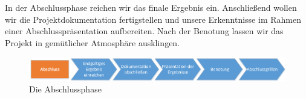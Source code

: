 In der Abschlussphase reichen wir das finale Ergebnis ein. Anschließend wollen wir die Projektdokumentation fertigstellen und unsere Erkenntnisse im Rahmen einer Abschlusspräsentation aufbereiten. Nach der Benotung lassen wir das Projekt in gemütlicher Atmosphäre ausklingen.

\begin{figure}[h]
\centering
\includegraphics[width=1\linewidth]{Bilder/ProjektAbschluss}
\caption{Die Abschlussphase}
\label{fig:ProjektAbschluss}
\end{figure}
